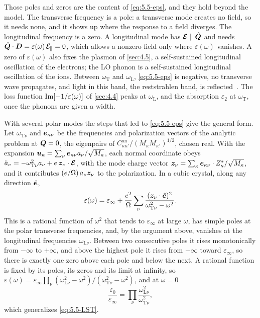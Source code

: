 Those poles and zeros are the content of \cref{eq:5.5-eps}, and they hold beyond the model. The transverse frequency is a pole: a transverse mode creates no field, so it needs none, and it shows up where the response to a field diverges. The longitudinal frequency is a zero. A longitudinal mode has $\bm{\mathcal{E}} \parallel \hat{\bm{Q}}$ and needs $\hat{\bm{Q}}\cdot\bm{D} = \varepsilon(\omega)\,\mathcal{E}_\parallel = 0$, which allows a nonzero field only where $\varepsilon(\omega)$ vanishes. A zero of $\varepsilon(\omega)$ also fixes the plasmon of \cref{sec:4.5}, a self-sustained longitudinal oscillation of the electrons; the LO phonon is a self-sustained longitudinal oscillation of the ions. Between $\omega_{\mathrm{T}}$ and $\omega_{\mathrm{L}}$, \cref{eq:5.5-eps} is negative, no transverse wave propagates, and light in this band, the reststrahlen band, is reflected~\cite[Chap.~27]{ashcroft1976solid}. The loss function $\operatorname{Im}[-1/\varepsilon(\omega)]$ of \cref{sec:4.4} peaks at $\omega_{\mathrm{L}}$, and the absorption $\varepsilon_2$ at $\omega_{\mathrm{T}}$, once the phonons are given a width.

With several polar modes the steps that led to \cref{eq:5.5-eps} give the general form. Let $\omega_{\mathrm{T}\nu}$ and $\bm{e}_{\kappa\nu}$ be the frequencies and polarization vectors of the analytic problem at $\bm{Q} = 0$, the eigenpairs of $C^{\mathrm{an}}_{\kappa\kappa'}/(M_\kappa M_{\kappa'})^{1/2}$, chosen real. With the expansion $\bm{u}_\kappa = \sum_\nu\bm{e}_{\kappa\nu}a_\nu/\sqrt{M_\kappa}$, each normal coordinate obeys $\ddot a_\nu = -\omega_{\mathrm{T}\nu}^2a_\nu + e\,\bm{z}_\nu\cdot\bm{\mathcal{E}}$, with the mode charge vector $\bm{z}_\nu = \sum_\kappa\bm{e}_{\kappa\nu}\cdot Z^*_\kappa/\sqrt{M_\kappa}$, and it contributes $(e/\Omega)\,a_\nu\bm{z}_\nu$ to the polarization. In a cubic crystal, along any direction $\hat{\bm{e}}$,
\begin{equation*}
  \varepsilon(\omega) = \varepsilon_\infty + \frac{e^2}{\Omega}\sum_\nu\frac{(\bm{z}_\nu\cdot\hat{\bm{e}})^2}{\omega_{\mathrm{T}\nu}^2 - \omega^2} .
\end{equation*}
This is a rational function of $\omega^2$ that tends to $\varepsilon_\infty$ at large $\omega$, has simple poles at the polar transverse frequencies, and, by the argument above, vanishes at the longitudinal frequencies $\omega_{\mathrm{L}\nu}$. Between two consecutive poles it rises monotonically from $-\infty$ to $+\infty$, and above the highest pole it rises from $-\infty$ toward $\varepsilon_\infty$, so there is exactly one zero above each pole and below the next. A rational function is fixed by its poles, its zeros and its limit at infinity, so $\varepsilon(\omega) = \varepsilon_\infty\prod_\nu(\omega_{\mathrm{L}\nu}^2 - \omega^2)/(\omega_{\mathrm{T}\nu}^2 - \omega^2)$, and at $\omega = 0$
\begin{equation}
  \frac{\varepsilon_0}{\varepsilon_\infty} = \prod_\nu\frac{\omega_{\mathrm{L}\nu}^2}{\omega_{\mathrm{T}\nu}^2} ,
  \label{eq:D.14-LSTgen}
\end{equation}
which generalizes \cref{eq:5.5-LST}.

